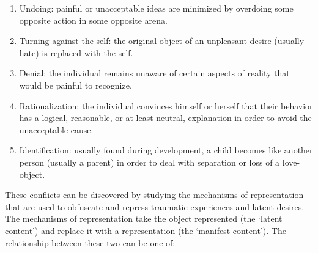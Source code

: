 \begin{enumerate}
\item Undoing: painful or unacceptable ideas are minimized by overdoing some opposite action in some opposite arena.

\item Turning against the self: the original object of an unpleasant desire (usually hate) is replaced with the self.

\item Denial: the individual remains unaware of certain aspects of reality that would be painful to recognize.

\item Rationalization: the individual convinces himself or herself that their behavior has a logical, reasonable, or at least neutral, explanation in order to avoid the unacceptable cause.

\item Identification: usually found during development, a child becomes like another person (usually a parent) in order to deal with separation or loss of a love-object.

\end{enumerate}

These conflicts can be discovered by studying the mechanisms of representation that are used to obfuscate and repress traumatic experiences and latent desires. The mechanisms of representation take the object represented (the `latent content') and replace it with a representation (the `manifest content'). The relationship between these two can be one of:

